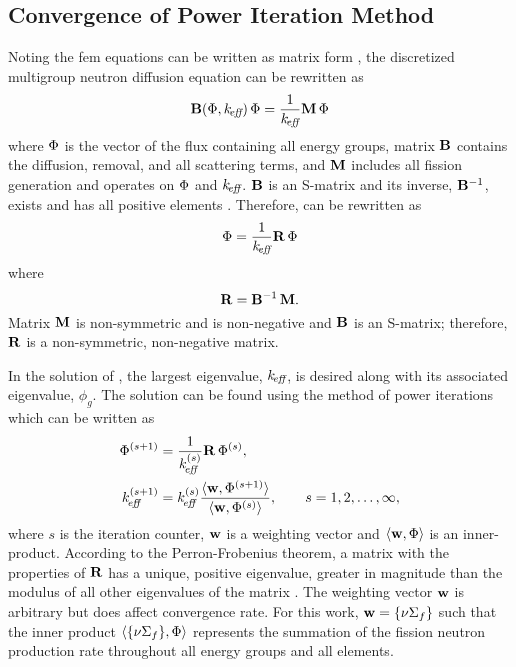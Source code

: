   \subsection{Convergence of Power Iteration Method}
    Noting the \gls{fem} equations can be written as matrix form
    , the discretized multigroup neutron diffusion 
    equation can be rewritten as 
    \begin{equation}
      \label{eq:gehin_notation}
      \mathbf{B}(\Phi,k_{\!\mbox{\scriptsize \em eff}}) \, \Phi = \frac{1}{k_{\!\mbox{\scriptsize \em eff}}} \mathbf{M} \, \Phi
    \end{equation}
    where $\Phi$ is the vector of the flux containing all energy groups, matrix 
    $\mathbf{B}$ contains the diffusion, removal, and all scattering terms, and $\mathbf{M}$ 
    includes all fission generation and operates on $\Phi$ and $k_{\!\mbox{\scriptsize \em eff}}$. $\mathbf{B}$
    is an S-matrix and its inverse, $\mathbf{B}^{-1}$, exists and has all positive 
    elements \cite{nakamura}. Therefore,  can be 
    rewritten as
    \begin{equation}
      \label{eq:gehin_solution}
      \Phi = \frac{1}{k_{\!\mbox{\scriptsize \em eff}}} \mathbf{R} \, \Phi
    \end{equation}
    where
    \begin{equation}
      \label{eq:gehin_r}
      \mathbf{R} = \mathbf{B}^{-1} \, \mathbf{M}.
    \end{equation}
    Matrix $\mathbf{M}$ is non-symmetric and is non-negative and $\mathbf{B}$ is an S-matrix;
    therefore, $\mathbf{R}$ is a non-symmetric, non-negative matrix.

    In the solution of , the largest eigenvalue,
    $k_{\!\mbox{\scriptsize \em eff}}$, is desired along with its associated eigenvalue, $\phi_g$. The
    solution can be found using the method of power iterations which can be
    written as 
    \begin{align}
      \label{eq:power_iteration_phi}
      \Phi^{(s+1)} &= \frac{1}{k_{\!\mbox{\scriptsize \em eff}}^{(s)}} \mathbf{R} \, \Phi^{(s)}, \\
      \label{eq:power_iteration_eigenvalue}
      k_{\!\mbox{\scriptsize \em eff}}^{(s+1)} &= k_{\!\mbox{\scriptsize \em eff}}^{(s)} \frac{\langle \mathbf{w}, \Phi^{(s+1)} \rangle}
        {\langle \mathbf{w}, \Phi^{(s)}\rangle}, \qquad s = 1,2,\ldots,\infty,
    \end{align}
    where $s$ is the iteration counter, $\mathbf{w}$ is a weighting vector and 
    $\langle\mathbf{w}, \Phi\rangle$ is an inner-product. According to the 
    Perron-Frobenius theorem, a matrix with the properties of $\mathbf{R}$ has a 
    unique, positive eigenvalue, greater in magnitude than the modulus of all 
    other eigenvalues of the matrix \cite{gehinThesis,nakamura}. The weighting 
    vector $\mathbf{w}$ is arbitrary but does affect convergence rate. For this work,
    $\mathbf{w} = \{\nu \Sigma_f\}$ such that the inner product $\langle\{\nu
    \Sigma_f\}, \Phi\rangle$ represents the summation of the fission neutron
    production rate throughout all energy groups and all elements. 
    
